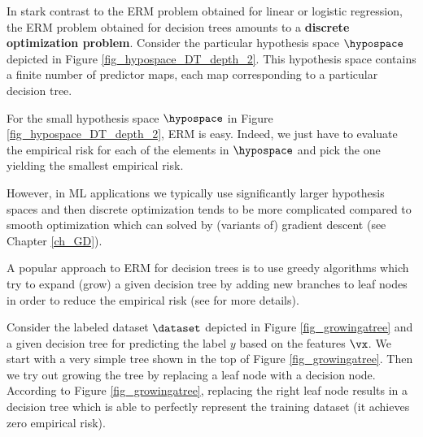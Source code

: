 \documentclass[12pt]{report}
\begin{document}
In stark contrast to the ERM problem obtained for linear or logistic 
regression, the ERM problem obtained for decision trees amounts 
to a {\bf discrete optimization problem}. Consider the particular 
hypothesis space $\hypospace$ depicted in Figure \ref{fig_hypospace_DT_depth_2}. 
This hypothesis space contains a finite number of predictor maps, 
each map corresponding to a particular decision tree. 

For the small hypothesis space $\hypospace$ in Figure \ref{fig_hypospace_DT_depth_2}, 
ERM is easy. Indeed, we just have to evaluate the empirical risk 
for each of the elements in $\hypospace$ and pick the one yielding 
the smallest empirical risk. 

However, in ML applications we typically use significantly 
larger hypothesis spaces and then discrete optimization tends to be 
more complicated compared to smooth optimization which can solved 
by (variants of) gradient descent (see Chapter \ref{ch_GD}). 

A popular approach to ERM for decision trees is to use greedy algorithms which try to expand (grow) 
a given decision tree by adding new branches to leaf nodes in order to reduce the empirical risk 
(see \cite[Chapter 8]{IntroSLR} for more details). 

\begin{center}
\end{center}

Consider the labeled dataset $\dataset$ depicted in Figure \ref{fig_growingatree} and a given decision tree for 
predicting the label $y$ based on the features $\vx$. We start with a very simple tree shown in the top of 
Figure \ref{fig_growingatree}. Then we try out growing the tree by replacing a leaf node with a decision node. 
According to Figure \ref{fig_growingatree}, replacing the right leaf node results in a decision tree which is 
able to perfectly represent the training dataset (it achieves zero empirical risk). 
 
 
\end{document}

